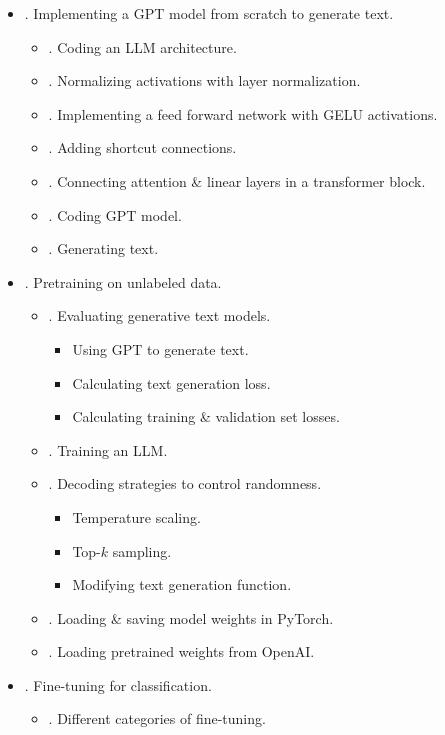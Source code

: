 \documentclass{article}
\begin{document}
\begin{itemize}
\begin{itemize}
\begin{itemize}
		\end{itemize}
	\end{itemize}
	\item {. Implementing a GPT model from scratch to generate text.}
	\begin{itemize}
		\item {. Coding an LLM architecture.}
		\item {. Normalizing activations with layer normalization.}
		\item {. Implementing a feed forward network with GELU activations.}
		\item {. Adding shortcut connections.}
		\item {. Connecting attention \& linear layers in a transformer block.}
		\item {. Coding GPT model.}
		\item {. Generating text.}
	\end{itemize}
	\item {. Pretraining on unlabeled data.}
	\begin{itemize}
		\item {. Evaluating generative text models.}
		\begin{itemize}
			\item {\sf Using GPT to generate text.}
			\item {\sf Calculating text generation loss.}
			\item {\sf Calculating training \& validation set losses.}
		\end{itemize}
		\item {. Training an LLM.}
		\item {. Decoding strategies to control randomness.}
		\begin{itemize}
			\item {\sf Temperature scaling.}
			\item {\sf Top-$k$ sampling.}
			\item {\sf Modifying text generation function.}
		\end{itemize}
		\item {. Loading \& saving model weights in PyTorch.}
		\item {. Loading pretrained weights from OpenAI.}
	\end{itemize}
	\item {. Fine-tuning for classification.}
	\begin{itemize}
		\item {. Different categories of fine-tuning.}

\end{itemize}
\end{itemize}
\end{document}
